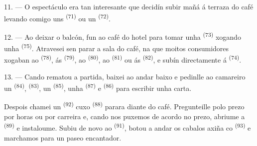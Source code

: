 \VUsaut{3.0mm}
\VUsaut{3.0mm}

11. --- O espectáculo era tan interesante que decidín subir mañá á terraza do café
levando comigo uns  \textsuperscript{(71)} ou un
 \textsuperscript{(72)}.

12. --- Ao deixar o balcón, fun ao café do hotel para tomar unha 
\textsuperscript{(73)} xogando unha  \textsuperscript{(75)}.
Atravesei sen parar a sala do café, na que moitos consumidores xogaban ao
 \textsuperscript{(78)}, ás  \textsuperscript{(79)}, ao
 \textsuperscript{(80)}, ao  \textsuperscript{(81)}
ou ás  \textsuperscript{(82)}, e subín directamente á  \textsuperscript{(74)}.

13. --- Cando rematou a partida, baixei ao andar baixo e pedinlle ao camareiro un
 \textsuperscript{(84)},  \textsuperscript{(83)}, un
 \textsuperscript{(85)}, unha 
\textsuperscript{(87)} e  \textsuperscript{(86)} para escribir unha
carta.

Despois chamei un  \textsuperscript{(92)} cuxo 
\textsuperscript{(88)} parara diante do café. Pregunteille polo prezo por horas ou por
carreira e, cando nos puxemos de acordo no prezo, abriume a 
\textsuperscript{(89)} e instaloume. Subiu de novo ao 
\textsuperscript{(91)}, botou a andar os cabalos axiña co 
\textsuperscript{(93)} e marchamos para un paseo encantador.
